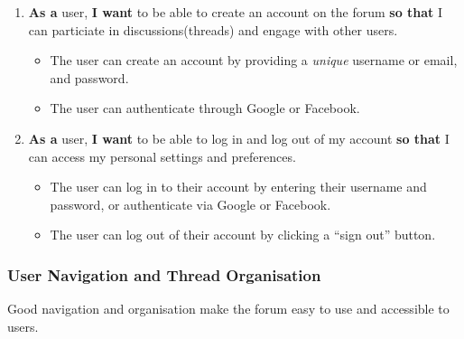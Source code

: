 \documentclass[10pt]{exam}
\providecommand{\tightlist}{%
  \setlength{\itemsep}{0pt}\setlength{\parskip}{0pt}}
\begin{document}
\begin{enumerate}
\def\labelenumi{\arabic{enumi}.}
\tightlist
\item
  \textbf{As a} user, \textbf{I want} to be able to create an account on
  the forum \textbf{so that} I can particiate in discussions(threads)
  and engage with other users.

  \begin{itemize}
  \tightlist
  \item
    The user can create an account by providing a \emph{unique} username
    or email, and password.
  \item
    The user can authenticate through Google or Facebook.
  \end{itemize}
\item
  \textbf{As a} user, \textbf{I want} to be able to log in and log out
  of my account \textbf{so that} I can access my personal settings and
  preferences.

  \begin{itemize}
  \tightlist
  \item
    The user can log in to their account by entering their username and
    password, or authenticate via Google or Facebook.
  \item
    The user can log out of their account by clicking a ``sign out''
    button.
  \end{itemize}
\end{enumerate}

\hypertarget{user-navigation-and-thread-organisation}{%
\subsubsection{User Navigation and Thread
Organisation}\label{user-navigation-and-thread-organisation}}

Good navigation and organisation make the forum easy to use and
accessible to users.
\end{document}
